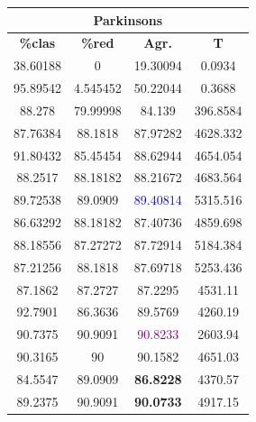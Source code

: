 \documentclass[11pt,a4paper]{article}
\theoremstyle{definition}
\begin{document}
\begin{tabbing}
{\begin{tabular}{|c|c|c|c|}
		\end{tabular}
		
		\begin{tabular}{|c|c|c|c|}
			\hline
			\multicolumn{4}{|c|}{\textbf{Parkinsons}} \\ \hline
			\textbf{\%clas} & \textbf{\%red} & \textbf{Agr.} & \textbf{T} \\ \hline 
			38.60188	&0	        &19.30094	&0.0934\\ \hline
95.89542&	4.545452	&50.22044	&0.3688\\ \hline
88.278	 & 79.99998	&84.139	  &396.8584\\ \hline
87.76384 & 88.1818 & 87.97282 & 4628.332\\ \hline
91.80432 & 85.45454 & 88.62944 & 4654.054\\ \hline
88.2517 & 88.18182 & 88.21672 & 4683.564\\ \hline
89.72538 & 89.0909 & \textcolor{blue}{89.40814} & 5315.516\\ \hline
86.63292 & 88.18182 & 87.40736 & 4859.698\\ \hline
88.18556 & 87.27272 & 87.72914 & 5184.384\\ \hline
87.21256 & 88.1818 & 87.69718 & 5253.436\\ \hline
87.1862 & 87.2727 & 87.2295 & 4531.11 \\ \hline
92.7901 & 86.3636 & 89.5769 & 4260.19 \\ \hline
90.7375 & 90.9091 & \textcolor{purple}{90.8233} & 2603.94 \\ \hline
90.3165 & 90 & 90.1582 & 4651.03 \\ \hline
84.5547 & 89.0909 & \textbf{86.8228} & 4370.57 \\ \hline
89.2375 & 90.9091 & \textbf{90.0733} & 4917.15 \\ \hline

		\end{tabular}
		
}
\end{tabbing}
\end{document}

